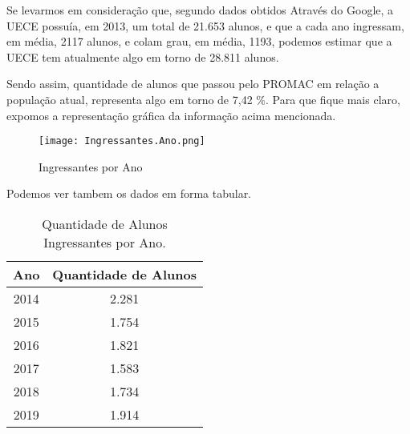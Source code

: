 \documentclass[12pt,a4paper]{article}
\begin{document}
        Se levarmos em consideração que, segundo dados obtidos Através do Google, a UECE possuía, em 2013, um total de 21.653 		alunos, e que a cada ano ingressam, em média, 2117 alunos, e colam grau, em média, 1193, podemos estimar que a UECE 			tem atualmente algo em torno de  28.811 alunos.

        Sendo assim, quantidade de alunos que passou pelo PROMAC em relação a população atual, representa algo em torno de 				7,42 \%. Para que fique mais claro, expomos a representação gráfica da informação acima mencionada.
        
        \begin{figure}[htb]
        	\centering
        	\texttt{[image: Ingressantes.Ano.png]}
        	\caption{Ingressantes por Ano}
        	\label{Ingressantes-Ano}
    	\end{figure}
    	
    	\pagebreak
    	
    	Podemos ver tambem os dados em forma tabular. \\

    	\begin{table}[!htb]
        	\begin{center}
            	\begin{tabular}{|c|c|}
                	\hline
                    Ano & Quantidade de Alunos \\ \hline
                    2014 & 2.281 \\ \hline
                    2015 & 1.754 \\ \hline
                    2016 & 1.821 \\ \hline
                    2017 & 1.583 \\ \hline
                    2018 & 1.734 \\ \hline
                    2019 & 1.914 \\ 
                	\hline
            	\end{tabular}
            	\caption{Quantidade de Alunos Ingressantes por Ano.}
            	\label{Tabela1}
        	\end{center}
    	\end{table}
    	

\end{document}
